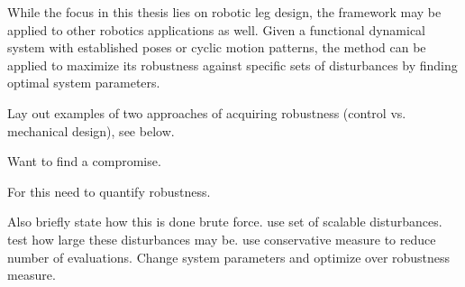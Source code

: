 While the focus in this thesis lies on robotic leg design, the framework may be applied to other robotics applications as well. Given a functional dynamical system with established poses or cyclic motion patterns, the method can be applied to maximize its robustness against specific sets of disturbances by finding optimal system parameters. 



\iffalse
Given .. system parameter optimization is possible. 

As long as a functioning model is at hand, 

The proposed robustness measure is however not limited to robotic leg design but can be applied to any dynamical system that interacts with its environment and for which an undisturbed desired behaviour is known apriori. 

Applications of the framework are not limited to robotic legs allows for robustness quantification and optimization of any dynamical system 

if system has established behaviour it can be made mor robust to disturbances
not limited to robotic legs
works in 
\fi
\iffalse
Lay out examples of two approaches of acquiring robustness (control vs. mechanical design), see below. 

Want to find a compromise. 

For this need to quantify robustness.

Also briefly state how this is done
brute force. use set of scalable disturbances. test how large these disturbances may be. use conservative measure to reduce number of evaluations. Change system parameters and optimize over robustness measure.




